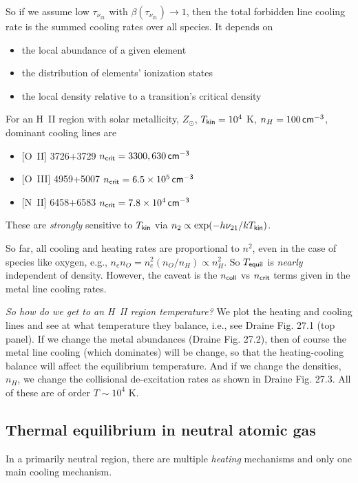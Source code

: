 \documentclass{tufte-handout}
\renewcommand{\rm}{\sf}
\newcommand{\HII}{\textnormal{H{\smaller~\textsc{II}}}}
\renewcommand{\smallcaps}[1]{{\smaller~\textsc{#1}}}
\newcommand{\spec}[2]{\textnormal{#1}\smallcaps{#2}} %
\begin{document}
So if we assume low $\tau_{\nu_{21}}$ with $\beta(\tau_{\nu_{21}}) \rightarrow 1$, then the total forbidden line cooling rate is the summed cooling rates over all species. It depends on
\begin{itemize}
\item[] the local abundance of a given element
\item[] the distribution of elements' ionization states
\item[] the local density relative to a transition's critical density
\end{itemize}

For an \HII{} region with solar metallicity, $Z_\odot$, $T_{\rm kin} = 10^4$ K, $n_H = 100 \,{\rm cm}^{-3}$, dominant cooling lines are
\begin{itemize}
\item{} [\spec{O}{II}] 3726+3729 $n_{\rm crit} = 3300, 630 {\rm\, cm^{-3}}$
\item{} [\spec{O}{III}] 4959+5007 $n_{\rm crit} = 6.5 \times 10^5 {\rm \, cm^{-3}}$
\item{} [\spec{N}{II}] 6458+6583 $n_{\rm crit} = 7.8 \times 10^4 {\rm\, cm^{-3}}$
\end{itemize}
These are \textit{strongly} sensitive to $T_{\rm kin}$ via $n_2 \propto \exp(-h\nu_{21} / kT_{\rm kin})$.

So far, all cooling and heating rates are proportional to $n^2$, even in the case of species like oxygen, e.g., $n_en_O = n_e^2 (n_O/n_H) \propto n_H^2$. So $T_{\rm equil}$ is \textit{nearly} independent of density. However, the caveat is the $n_{\rm coll}$ vs $n_{\rm crit}$ terms given in the metal line cooling rates. 

\textit{So how do we get to an \HII{} region temperature?} We plot the heating and cooling lines and see at what temperature they balance, i.e., see Draine Fig. 27.1 (top panel). If we change the metal abundances (Draine Fig. 27.2), then of course the metal line cooling (which dominates) will be change, so that the heating-cooling balance will affect the equilibrium temperature. And if we change the densities, $n_H$, we change the collisional de-excitation rates as shown in Draine Fig. 27.3. All of these are of order $T \sim 10^4$ K.

\subsection{Thermal equilibrium in neutral atomic gas}
In a primarily neutral region, there are multiple \textit{heating} mechanisms and only one main cooling mechanism. 
\end{document}
